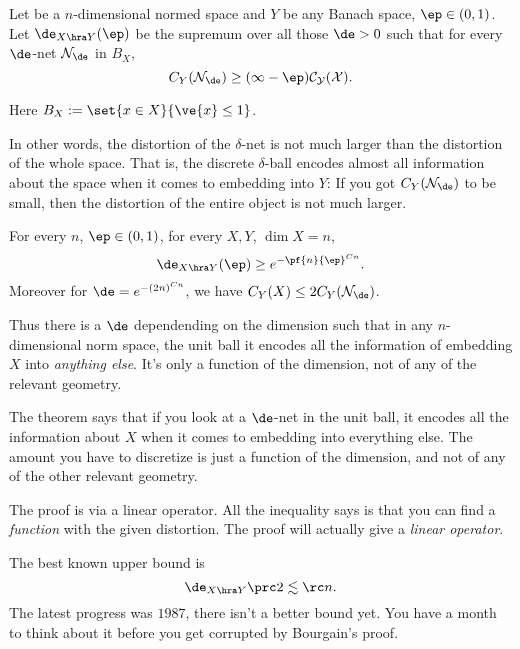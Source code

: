 \begin{df} \label{df:disc-mod}
Let be a $n$-dimensional normed space and $Y$ be any Banach space, $\ep\in (0,1)$. Let $\de_{X\hra Y}(\ep)$ be the supremum over all those $\de>0$ such that for every $\de$-net $\cal N_\de$ in $B_X$, 
\[C_Y(\cal N_\de)\ge (1-\ep)C_Y(X).\]

Here $B_X:=\set{x\in X}{\ve{x}\le 1}$.
\end{df}
In other words, the distortion of the $\delta$-net is not much larger than the distortion of the whole space. That is, the discrete $\delta$-ball encodes almost all information about the space when it comes to embedding into $Y$: If you got $C_Y(\cal N_\de)$ to be small, then the distortion of the entire object is not much larger.
\begin{thm}\label{thm:bdt}
For every $n$, $\ep\in (0,1)$, for every $X,Y$, $\dim X=n$, 
\[
\de_{X\hra Y}(\ep)\ge  e^{-\pf{n}{\ep}^{Cn}}.
\]
Moreover for $\de=e^{-(2n)^{Cn}}$, we have $C_Y(X)\le 2C_Y(\cal N_\de)$. %
\end{thm}
Thus there is a $\de$ dependending on the dimension such that in any $n$-dimensional norm space, the unit ball it encodes all the information of embedding $X$ into \emph{anything else}. It's only a function of the dimension, not of any of the relevant geometry. 



The theorem says that if you look at a $\de$-net in the unit ball, it encodes all the information about $X$ when it comes to embedding into everything else. %
The amount you have to discretize is just a function of the dimension, and not of any of the other relevant geometry.
\begin{rem}
The proof is via a linear operator. All the inequality says is that you can find a \emph{function} with the given distortion. The proof will actually give a \emph{linear operator}. 
\end{rem}

The best known upper bound is 
\[
\de_{X\hra Y}\prc2 \lesssim\rc n.
\]
The latest progress was $1987$, there isn't a better bound yet. You have a month to think about it before you get corrupted by Bourgain's proof. 


